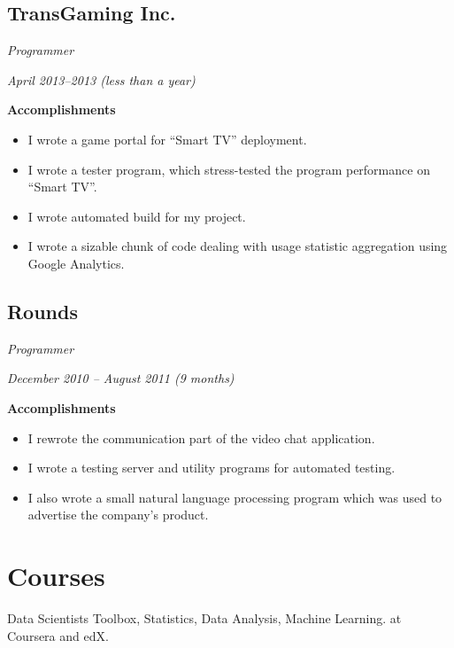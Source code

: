 \documentclass[11pt]{article}
\begin{document}
\subsection{TransGaming Inc.}
\label{sec:orgheadline10}
\begin{description}
\item[{Position}] \emph{Programmer}
\item[{Term}] \emph{April 2013--2013 (less than a year)}
\item \textbf{Accomplishments}
\begin{itemize}
\item I wrote a game portal for ``Smart TV'' deployment.
\item I wrote a tester program, which stress-tested the program performance
on ``Smart TV''.
\item I wrote automated build for my project.
\item I wrote a sizable chunk of code dealing with usage statistic aggregation
using Google Analytics.
\end{itemize}
\end{description}

\subsection{Rounds}
\label{sec:orgheadline11}
\begin{description}
\item[{Position}] \emph{Programmer}
\item[{Term}] \emph{December 2010 – August 2011 (9 months)}
\item \textbf{Accomplishments}
\begin{itemize}
\item I rewrote the communication part of the video chat application.
\item I wrote a testing server and utility programs for automated testing.
\item I also wrote a small natural language processing program which was used
to advertise the company's product.
\end{itemize}
\end{description}

\section{Courses}
\label{sec:orgheadline13}
Data Scientists Toolbox, Statistics, Data Analysis, Machine Learning. at
Coursera and edX.
\end{document}
